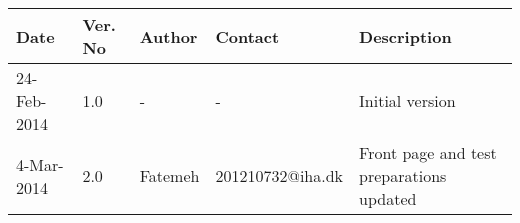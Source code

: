\begin{center}
    \begin{tabular}{ | l | p{1cm} | l | l | p{4cm} |}
    \hline
    Date&Ver. No & Author &Contact &Description\\ \hline
	24-Feb-2014&1.0 & - & - & Initial version\\
	    \hline
	4-Mar-2014&2.0 & Fatemeh & 201210732@iha.dk & Front page and test preparations updated\\
    \hline
    \end{tabular}
\end{center}